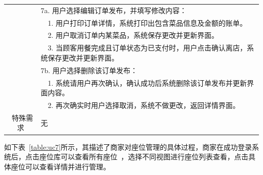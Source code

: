 \begin{table}[htbp!]
\begin{tabular}{cp{11.5cm}}
    & 7a. 用户选择编辑订单发布，并填写修改内容：\\
    & ~~1.	用户打印订单详情，系统打印出包含菜品信息及金额的账单。\\
    & ~~2.	用户取消订单内某菜品，系统保存更改并更新界面。\\
    & ~~3.	当顾客用餐完成且订单状态为已支付时，用户点击确认离店，系统保存更改并更新界面。\\
    & 7b. 用户选择删除该订单发布：\\
    & ~~1.	系统请用户再次确认，确认成功后系统删除该订单发布并更新界面内容。\\
    & ~~2.	再次确实时用户选择取消，系统不做更改，返回详情界面。\\
  \hline
  \ 特殊需求 & 无 \\ 
  \hline
  \end{tabular}
  \label{table:uc6}
\end{table}

如下表~\ref{table:uc7}所示，其描述了商家对座位管理的具体过程，商家在成功登录系统后，点击座位库可以查看所有座位~\cite{zdx2019}，选择不同视图进行座位列表查看，点击具体座位可以查看详情并进行管理。

